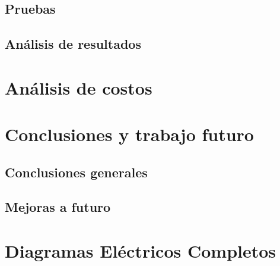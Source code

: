\documentclass[a4paper,12pt]{report}
\begin{document}
%
%

\section{Pruebas}


\section{Análisis de resultados}




\chapter{Análisis de costos}

\chapter{Conclusiones y trabajo futuro}

\section{Conclusiones generales}




\section{Mejoras a futuro}




\appendix
\chapter{Diagramas Eléctricos Completos}

\end{document}
